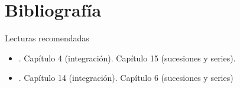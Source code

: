 \documentclass[9pt, aspectratio=169]{beamer}
\begin{document}
\section*{Bibliografía}
\begin{frame}[allowframebreaks]{Lecturas recomendadas}
\begin{itemize}
 \item {}. Capítulo 4 (integración). Capítulo 15 (sucesiones y series).
 \item {}. Capítulo 14 (integración). Capítulo 6 (sucesiones y series)
\end{itemize}

\end{frame}
\end{document}
